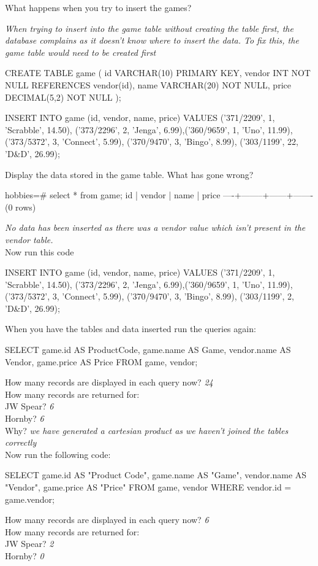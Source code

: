 What happens when you try to insert the games? 

\textit{When trying to insert into the game table without creating the table first, the database complains as it doesn't know where to insert the data. To fix this, the game table would need to be created first}
\begin{sql}
CREATE TABLE game ( 
  id     VARCHAR(10)  PRIMARY KEY,
  vendor INT          NOT NULL REFERENCES vendor(id),
  name   VARCHAR(20)  NOT NULL,
  price  DECIMAL(5,2) NOT NULL
);

INSERT INTO game (id, vendor, name, price)
VALUES ('371/2209', 1, 'Scrabble', 14.50), ('373/2296', 2, 'Jenga', 6.99),('360/9659', 1, 'Uno', 11.99), ('373/5372', 3, 'Connect', 5.99), ('370/9470', 3, 'Bingo', 8.99), ('303/1199', 22, 'D&D', 26.99);
\end{sql}

Display the data stored in the game table. What has gone wrong?
\begin{pseudo}
hobbies=# select * from game;
 id | vendor | name | price
----+--------+------+-------
(0 rows)
\end{pseudo}
\textit{No data has been inserted as there was a vendor value which isn't present in the vendor table.}\\
Now run this code
\begin{sql}
INSERT INTO game (id, vendor, name, price)
VALUES ('371/2209', 1, 'Scrabble', 14.50), ('373/2296', 2, 'Jenga', 6.99),('360/9659', 1, 'Uno', 11.99), ('373/5372', 3, 'Connect', 5.99), ('370/9470', 3, 'Bingo', 8.99), ('303/1199', 2, 'D&D', 26.99);
\end{sql}
When you have the tables and data inserted run the queries again:
\begin{sql}
SELECT game.id     AS ProductCode,
       game.name   AS Game,
       vendor.name AS Vendor,
       game.price  AS Price 
FROM game, vendor;
\end{sql}
How many records are displayed in each query now? \textit{24}\\
How many records are returned for: \\
JW Spear? \textit{6}\\
Hornby? \textit{6}\\
Why? \textit{we have generated a cartesian product as we haven't joined the tables correctly}\\

Now run the following code:
\begin{sql}
SELECT game.id     AS "Product Code",
       game.name   AS "Game",
       vendor.name AS "Vendor",
       game.price  AS "Price" 
FROM game, vendor
WHERE  vendor.id = game.vendor;
\end{sql}
How many records are displayed in each query now? \textit{6}\\
How many records are returned for: \\
JW Spear? \textit{2}\\
Hornby? \textit{0}\\

